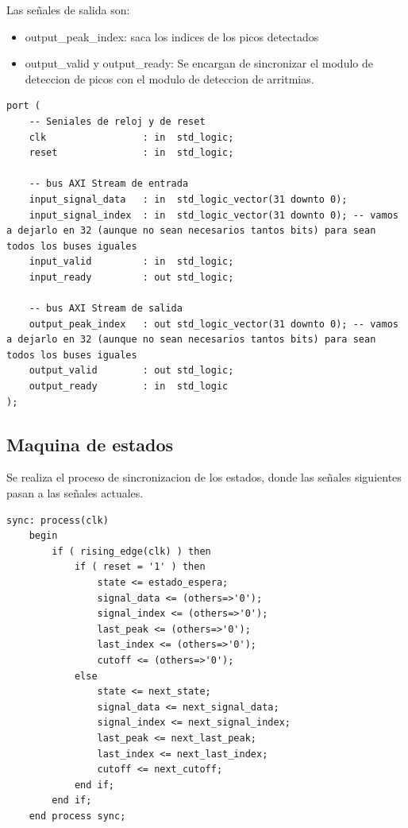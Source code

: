     Las señales de salida son:
    
    \begin{itemize}
        \item output\_peak\_index: saca los indices de los picos detectados
        \item output\_valid y output\_ready: Se encargan de sincronizar el modulo de deteccion de picos 
        con el modulo de deteccion de arritmias.
    \end{itemize}
    
\lstset{language=VHDL, breaklines=true, basicstyle=\footnotesize}
\begin{lstlisting}[frame=single] 
port (
    -- Seniales de reloj y de reset
    clk                 : in  std_logic;
    reset               : in  std_logic; 
    
    -- bus AXI Stream de entrada
    input_signal_data   : in  std_logic_vector(31 downto 0);
    input_signal_index  : in  std_logic_vector(31 downto 0); -- vamos a dejarlo en 32 (aunque no sean necesarios tantos bits) para sean todos los buses iguales
    input_valid         : in  std_logic;
    input_ready         : out std_logic;
    
    -- bus AXI Stream de salida
    output_peak_index   : out std_logic_vector(31 downto 0); -- vamos a dejarlo en 32 (aunque no sean necesarios tantos bits) para sean todos los buses iguales
    output_valid        : out std_logic;
    output_ready        : in  std_logic   
);
\end{lstlisting}
\subsection{Maquina de estados}
Se realiza el proceso de sincronizacion de los estados, donde las señales siguientes pasan a las señales actuales.

\lstset{language=VHDL, breaklines=true, basicstyle=\footnotesize}
\begin{lstlisting}[frame=single]
    sync: process(clk)
    begin
        if ( rising_edge(clk) ) then
            if ( reset = '1' ) then
                state <= estado_espera;
                signal_data <= (others=>'0');
                signal_index <= (others=>'0');
                last_peak <= (others=>'0');
                last_index <= (others=>'0');
                cutoff <= (others=>'0');
            else
                state <= next_state;
                signal_data <= next_signal_data;
                signal_index <= next_signal_index;
                last_peak <= next_last_peak;
                last_index <= next_last_index; 
                cutoff <= next_cutoff;
            end if;
        end if;
    end process sync;
\end{lstlisting}

